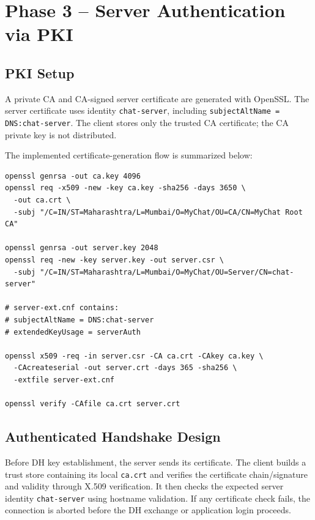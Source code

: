 \documentclass[11pt]{article}
\begin{document}
\section{Phase 3 -- Server Authentication via PKI}

\subsection{PKI Setup}

A private CA and CA-signed server certificate are generated with OpenSSL. The server certificate uses identity \texttt{chat-server}, including \texttt{subjectAltName = DNS:chat-server}. The client stores only the trusted CA certificate; the CA private key is not distributed.

The implemented certificate-generation flow is summarized below:

\begin{lstlisting}[basicstyle=\ttfamily\small,breaklines=true]
openssl genrsa -out ca.key 4096
openssl req -x509 -new -key ca.key -sha256 -days 3650 \
  -out ca.crt \
  -subj "/C=IN/ST=Maharashtra/L=Mumbai/O=MyChat/OU=CA/CN=MyChat Root CA"

openssl genrsa -out server.key 2048
openssl req -new -key server.key -out server.csr \
  -subj "/C=IN/ST=Maharashtra/L=Mumbai/O=MyChat/OU=Server/CN=chat-server"

# server-ext.cnf contains:
# subjectAltName = DNS:chat-server
# extendedKeyUsage = serverAuth

openssl x509 -req -in server.csr -CA ca.crt -CAkey ca.key \
  -CAcreateserial -out server.crt -days 365 -sha256 \
  -extfile server-ext.cnf

openssl verify -CAfile ca.crt server.crt
\end{lstlisting}

\subsection{Authenticated Handshake Design}

Before DH key establishment, the server sends its certificate. The client builds a trust store containing its local \texttt{ca.crt} and verifies the certificate chain/signature and validity through X.509 verification. It then checks the expected server identity \texttt{chat-server} using hostname validation. If any certificate check fails, the connection is aborted before the DH exchange or application login proceeds.
\end{document}
